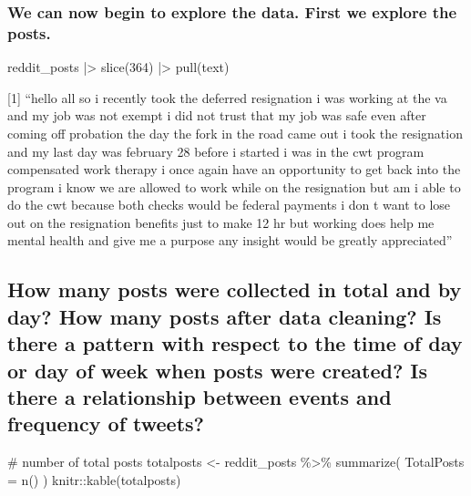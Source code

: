 \documentclass[
  letterpaper,
  DIV=11,
  numbers=noendperiod]{scrartcl}
\newenvironment{Shaded}{\begin{snugshade}}{\end{snugshade}}
\newcommand{\AttributeTok}[1]{\textcolor[rgb]{0.40,0.45,0.13}{#1}}
\newcommand{\CommentTok}[1]{\textcolor[rgb]{0.37,0.37,0.37}{#1}}
\newcommand{\DecValTok}[1]{\textcolor[rgb]{0.68,0.00,0.00}{#1}}
\newcommand{\FunctionTok}[1]{\textcolor[rgb]{0.28,0.35,0.67}{#1}}
\newcommand{\NormalTok}[1]{\textcolor[rgb]{0.00,0.23,0.31}{#1}}
\newcommand{\OtherTok}[1]{\textcolor[rgb]{0.00,0.23,0.31}{#1}}
\newcommand{\SpecialCharTok}[1]{\textcolor[rgb]{0.37,0.37,0.37}{#1}}
\begin{document}
\hfill\break

\subsubsection{We can now begin to explore the data. First we explore
the
posts.}\label{we-can-now-begin-to-explore-the-data.-first-we-explore-the-posts.}

\begin{Shaded}
\begin{Highlighting}[]
\NormalTok{  reddit\_posts }\SpecialCharTok{|\textgreater{}}
  \FunctionTok{slice}\NormalTok{(}\DecValTok{364}\NormalTok{) }\SpecialCharTok{|\textgreater{}} 
  \FunctionTok{pull}\NormalTok{(text) }
\end{Highlighting}
\end{Shaded}

{[}1{]} ``hello all so i recently took the deferred resignation i was
working at the va and my job was not exempt i did not trust that my job
was safe even after coming off probation the day the fork in the road
came out i took the resignation and my last day was february 28 before i
started i was in the cwt program compensated work therapy i once again
have an opportunity to get back into the program i know we are allowed
to work while on the resignation but am i able to do the cwt because
both checks would be federal payments i don t want to lose out on the
resignation benefits just to make 12 hr but working does help me mental
health and give me a purpose any insight would be greatly appreciated''

\subsection{How many posts were collected in total and by day? How many
posts after data cleaning? Is there a pattern with respect to the time
of day or day of week when posts were created? Is there a relationship
between events and frequency of
tweets?}\label{how-many-posts-were-collected-in-total-and-by-day-how-many-posts-after-data-cleaning-is-there-a-pattern-with-respect-to-the-time-of-day-or-day-of-week-when-posts-were-created-is-there-a-relationship-between-events-and-frequency-of-tweets}

\begin{Shaded}
\begin{Highlighting}[]
\CommentTok{\# number of total posts}
\NormalTok{totalposts }\OtherTok{\textless{}{-}}\NormalTok{ reddit\_posts }\SpecialCharTok{\%\textgreater{}\%}
  \FunctionTok{summarize}\NormalTok{(}
    \AttributeTok{TotalPosts =} \FunctionTok{n}\NormalTok{()}
\NormalTok{  )}
\NormalTok{knitr}\SpecialCharTok{::}\FunctionTok{kable}\NormalTok{(totalposts)}
\end{Highlighting}
\end{Shaded}
\end{document}
